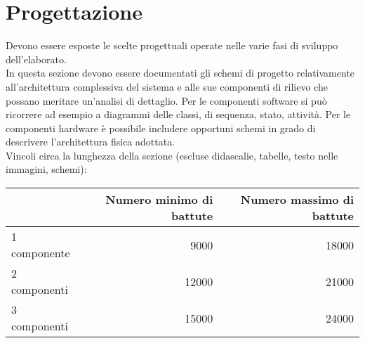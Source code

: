 
\section{Progettazione}

Devono essere esposte le scelte progettuali operate nelle varie fasi di sviluppo dell'elaborato.\\

In questa sezione devono essere documentati gli schemi di progetto relativamente all'architettura complessiva del sistema e alle sue componenti di rilievo che possano meritare un'analisi di dettaglio. Per le componenti software si può ricorrere ad esempio a diagrammi delle classi, di sequenza, stato, attività. Per le componenti hardware è possibile includere opportuni schemi in grado di descrivere l'architettura fisica adottata.\\

Vincoli circa la lunghezza della sezione (escluse didascalie, tabelle, testo nelle immagini, schemi):

\vspace{1cm}
\begin{tabular}{l|rr}
 & Numero minimo di battute & Numero massimo di battute \\
 \hline
 1 componente & 9000 & 18000 \\
 2 componenti & 12000 & 21000 \\
 3 componenti & 15000 & 24000 \\
 \hline
\end{tabular}


\newpage